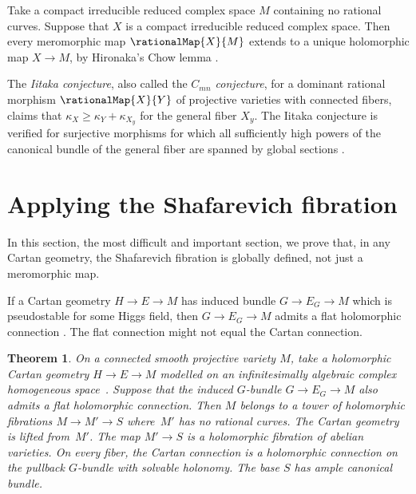 \documentclass[pdftex]{sigma}
\numberwithin{equation}{section}
\newtheorem{Theorem}{Theorem}[section]
\begin{document}
Take a compact irreducible reduced complex space $M$ containing no rational curves.
Suppose that $X$ is a compact irreducible reduced complex space. Then every meromorphic map $\rationalMap{X}{M}$ extends to a unique holomorphic map $X \to M$, by Hironaka's Chow lemma \cite[Corollary~2.9]{Grauert:1994}.

The \emph{Iitaka conjecture}, also called the \emph{$C_{mn}$ conjecture}, for a dominant rational morphism $\rationalMap{X}{Y}$ of projective varieties with connected fibers, claims that $\kappa_X \ge \kappa_Y + \kappa_{X_y}$ for the general fiber $X_y$.
The Iitaka conjecture is verified for surjective morphisms for which all sufficiently high powers of the canonical bundle of the general fiber are spanned by global sections \cite[Corollary~1.2]{Kawamata:1985}.

\section{Applying the Shafarevich fibration}
In this section, the most difficult and important section, we prove that, in any Cartan geometry, the Shafarevich fibration is globally defined, not just a meromorphic map.
\begin{Example}
If a Cartan geometry $H \to E \to M$ has induced bundle $G \to E_G
\to M$ which is pseudostable for some Higgs field, then $G \to E_G \to M$ admits a
flat holomorphic connection \cite[Theorem~1.1]{Biswas/Gomez:2008}.
The flat connection might not equal the Cartan connection.
\end{Example}

\begin{Theorem}\label{theorem:JR}
On a connected smooth projective variety $M$, take a holomorphic Cartan geometry $H\to E \to M$ modelled on an infinitesimally algebraic complex homogeneous space~.
Suppose that the induced $G$-bundle $G \to E_G \to M$ also admits a flat holomorphic connection.
Then $M$ belongs to a tower of holomorphic fibrations $M \to M' \to S$ where~$M'$ has no rational curves.
The Cartan geometry is lifted from~$M'$.
The map $M' \to S$ is a holomorphic fibration of abelian varieties.
On every fiber, the Cartan connection is a holomorphic connection on the pullback $G$-bundle with solvable holonomy.
The base $S$ has ample canonical bundle.
\end{Theorem}
\end{document}
